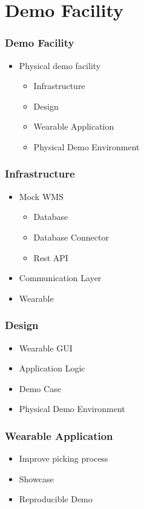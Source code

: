 \section{Demo Facility}
\begin{frame}\frametitle{Demo Facility}
	\begin{itemize}
		\item Physical demo facility
		\begin{itemize}
			\item Infrastructure
			\item Design
			\item Wearable Application
			\item Physical Demo Environment
		\end{itemize}
	\end{itemize}
\end{frame}
\begin{frame}\frametitle{Infrastructure}
\begin{itemize}
	\item Mock WMS
	\begin{itemize}
		\item Database
		\item Database Connector
		\item Rest API
	\end{itemize}
	\item Communication Layer
	\item Wearable	
\end{itemize}
\end{frame}
\begin{frame}\frametitle{Design}
	\begin{itemize}
		\item Wearable GUI
		\item Application Logic
		\item Demo Case
		\item Physical Demo Environment
	\end{itemize}
\end{frame}
\begin{frame}\frametitle{Wearable Application}
	\begin{itemize}
		\item Improve picking process
		\item Showcase
		\item Reproducible Demo
	\end{itemize}
\end{frame}